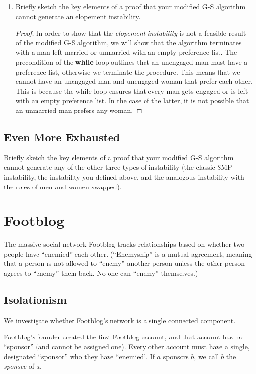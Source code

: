 \documentclass[11pt, oneside]{article}   	%
\theoremstyle{definition}
\theoremstyle{remark}
\begin{document}
\begin{enumerate}
\begin{enumerate}
   \end{enumerate}
	\item Briefly sketch the key elements of a proof that your modified G-S algorithm cannot generate an elopement instability.
	
	\begin{proof}
		In order to show that the \textit{elopement instability} is not a feasible result of the modified G-S algorithm, we will show that the algorithm terminates with a man left married or unmarried  with an empty preference list. The precondition of the \textbf{while} loop outlines that an unengaged man must have a preference list, otherwise we terminate the procedure. This means that we cannot have an unengaged man and unengaged woman that prefer each other. This is because the while loop ensures that every man gets engaged or is left with an empty preference list. In the case of the latter, it is not possible that an unmarried man prefers any woman.
	\end{proof}
\end{enumerate}
\subsection{Even More Exhausted}

Briefly sketch the key elements of a proof that your modified G-S
algorithm cannot generate any of the other three types of instability
(the classic SMP instability, the instability you defined above, and
the analogous instability with the roles of men and women swapped).
\section{Footblog}

The massive social network Footblog tracks relationships based on
whether two people have ``enemied'' each other. (``Enemyship'' is a mutual
agreement, meaning that a person is not allowed to ``enemy'' another
person unless the other person agrees to ``enemy'' them back. No one can
``enemy'' themselves.)
\subsection{Isolationism}

We investigate whether Footblog's network is a single connected
component.

Footblog's founder created the first Footblog account, and that
account has no ``sponsor'' (and cannot be assigned one). Every other
account must have a single, designated ``sponsor'' who they have
``enemied''. If $a$ sponsors $b$, we call $b$ the \emph{sponsee} of $a$.
\end{document}
